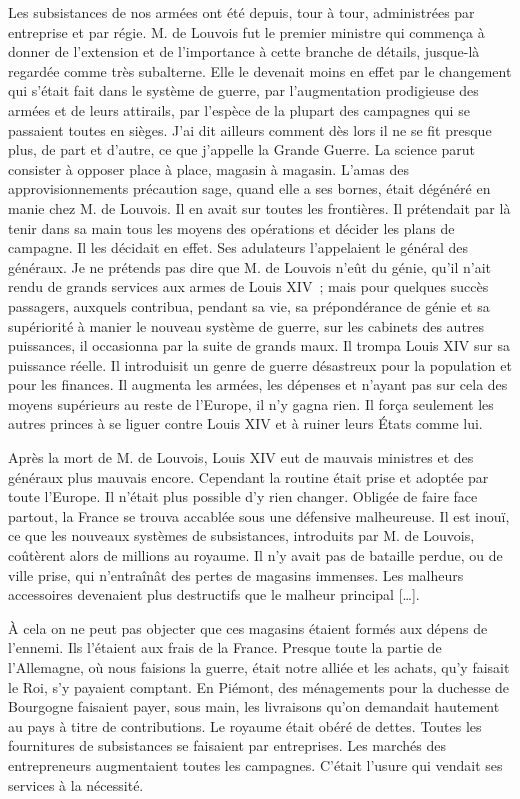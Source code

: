 \documentclass[french,twoside]{book} %
\begin{document}
Les subsistances de nos armées ont été depuis, tour à tour, administrées par entreprise et par régie. M. de Louvois fut le premier ministre qui commença à donner de l’extension et de l’importance à cette branche de détails, jusque-là regardée comme très subalterne. Elle le devenait moins en effet par le changement qui s’était fait dans le système de guerre, par l’augmentation prodigieuse des armées et de leurs attirails, par l’espèce de la plupart des campagnes qui se passaient toutes en sièges. J’ai dit ailleurs comment dès lors il ne se fit presque plus, de part et d’autre, ce que j’appelle la Grande Guerre. La science parut consister à opposer place à place, magasin à magasin. L’amas des approvisionnements précaution sage, quand elle a ses bornes, était dégénéré en manie chez M. de Louvois. Il en avait sur toutes les frontières. Il prétendait par là tenir dans sa main tous les moyens des opérations et décider les plans de campagne. Il les décidait en effet. Ses adulateurs l’appelaient le général des généraux. Je ne prétends pas dire que M. de Louvois n’eût du génie, qu’il n’ait rendu de grands services aux armes de Louis XIV ; mais pour quelques succès passagers, auxquels contribua, pendant sa vie, sa prépondérance de génie et sa supériorité à manier le nouveau système de guerre, sur les cabinets des autres puissances, il occasionna par la suite de grands maux. Il trompa Louis XIV sur sa puissance réelle. Il introduisit un genre de guerre désastreux pour la population et pour les finances. Il augmenta les armées, les dépenses et n’ayant pas sur cela des moyens supérieurs au reste de l’Europe, il n’y gagna rien. Il força seulement les autres princes à se liguer contre Louis XIV et à ruiner leurs États comme lui.\par
Après la mort de M. de Louvois, Louis XIV eut de mauvais ministres et des généraux plus mauvais encore. Cependant la routine était prise et adoptée par toute l’Europe. Il n’était plus possible d’y rien changer. Obligée de faire face partout, la France se trouva accablée sous une défensive malheureuse. Il est inouï, ce que les nouveaux systèmes de subsistances, introduits par M. de Louvois, coûtèrent alors de millions au royaume. Il n’y avait pas de bataille perdue, ou de ville prise, qui n’entraînât des pertes de magasins immenses. Les malheurs accessoires devenaient plus destructifs que le malheur principal […].\par
À cela on ne peut pas objecter que ces magasins étaient formés aux dépens de l’ennemi. Ils l’étaient aux frais de la France. Presque toute la partie de l’Allemagne, où nous faisions la guerre, était notre alliée et les achats, qu’y faisait le Roi, s’y payaient comptant. En Piémont, des ménagements pour la duchesse de Bourgogne faisaient payer, sous main, les livraisons qu’on demandait hautement au pays à titre de contributions. Le royaume était obéré de dettes. Toutes les fournitures de subsistances se faisaient par entreprises. Les marchés des entrepreneurs augmentaient toutes les campagnes. C’était l’usure qui vendait ses services à la nécessité.\par
\end{document}
